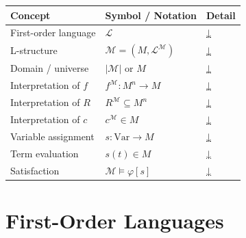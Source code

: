 

\begin{tcolorbox}[colback=gray!6, colframe=gray!40, arc=2pt,
  left=6pt, right=6pt, top=4pt, bottom=4pt,
  title={\small\textbf{L-Structures Toolkit — Quick Reference}},
  fonttitle=\small\bfseries]
\small
\begin{tabular}{l l l}
\toprule
\textbf{Concept} & \textbf{Symbol / Notation} & \textbf{Detail} \\
\midrule
First-order language    & $\mathcal{L}$                          & \hyperref[def:first-order-language]{↓} \\
L-structure             & $\mathcal{M} = (M, \mathcal{L}^{\mathcal{M}})$ & \hyperref[def:l-structure]{↓} \\
Domain / universe       & $|\mathcal{M}|$ or $M$                 & \hyperref[def:l-structure]{↓} \\
Interpretation of $f$   & $f^{\mathcal{M}} : M^n \to M$          & \hyperref[def:l-structure]{↓} \\
Interpretation of $R$   & $R^{\mathcal{M}} \subseteq M^n$        & \hyperref[def:l-structure]{↓} \\
Interpretation of $c$   & $c^{\mathcal{M}} \in M$                & \hyperref[def:l-structure]{↓} \\
Variable assignment     & $s : \mathrm{Var} \to M$               & \hyperref[def:variable-assignment]{↓} \\
Term evaluation         & $s(t) \in M$                           & \hyperref[def:term-evaluation]{↓} \\
Satisfaction            & $\mathcal{M} \models \varphi[s]$       & \hyperref[def:satisfaction]{↓} \\
\bottomrule
\end{tabular}
\end{tcolorbox}

\vspace{0.5em}


\section{First-Order Languages}

